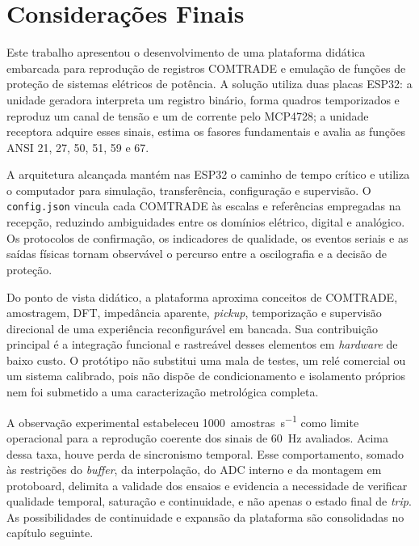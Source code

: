 \chapter{Considerações Finais}

Este trabalho apresentou o desenvolvimento de uma plataforma didática embarcada para reprodução de registros COMTRADE e emulação de funções de proteção de sistemas elétricos de potência. A solução utiliza duas placas ESP32: a unidade geradora interpreta um registro binário, forma quadros temporizados e reproduz um canal de tensão e um de corrente pelo MCP4728; a unidade receptora adquire esses sinais, estima os fasores fundamentais e avalia as funções ANSI 21, 27, 50, 51, 59 e 67.

A arquitetura alcançada mantém nas ESP32 o caminho de tempo crítico e utiliza o computador para simulação, transferência, configuração e supervisão. O \texttt{config.json} vincula cada COMTRADE às escalas e referências empregadas na recepção, reduzindo ambiguidades entre os domínios elétrico, digital e analógico. Os protocolos de confirmação, os indicadores de qualidade, os eventos seriais e as saídas físicas tornam observável o percurso entre a oscilografia e a decisão de proteção.

Do ponto de vista didático, a plataforma aproxima conceitos de COMTRADE, amostragem, DFT, impedância aparente, \textit{pickup}, temporização e supervisão direcional de uma experiência reconfigurável em bancada. Sua contribuição principal é a integração funcional e rastreável desses elementos em \textit{hardware} de baixo custo. O protótipo não substitui uma mala de testes, um relé comercial ou um sistema calibrado, pois não dispõe de condicionamento e isolamento próprios nem foi submetido a uma caracterização metrológica completa.

A observação experimental estabeleceu \SI{1000}{amostras\per\second} como limite operacional para a reprodução coerente dos sinais de \SI{60}{\hertz} avaliados. Acima dessa taxa, houve perda de sincronismo temporal. Esse comportamento, somado às restrições do \textit{buffer}, da interpolação, do ADC interno e da montagem em protoboard, delimita a validade dos ensaios e evidencia a necessidade de verificar qualidade temporal, saturação e continuidade, e não apenas o estado final de \textit{trip}. As possibilidades de continuidade e expansão da plataforma são consolidadas no capítulo seguinte.
